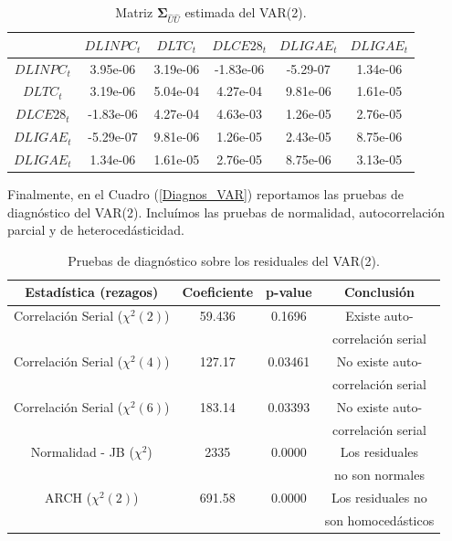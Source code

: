\documentclass[
  a4paper,
]{article}
\begin{document}
\begin{table}
\centering
\begin{tabular}{| c | c  c  c  c  c |}
\hline
     & $DLINPC_t$ & $DLTC_t$ & $DLCE28_t$ & $DLIGAE_t$ & $DLIGAE_t$ \\ \hline
    $DLINPC_t$ & 3.95e-06 & 3.19e-06 & -1.83e-06 & -5.29-07 & 1.34e-06 \\
    $DLTC_t$ & 3.19e-06 & 5.04e-04 & 4.27e-04 & 9.81e-06 & 1.61e-05 \\
    $DLCE28_t$ & -1.83e-06 & 4.27e-04 & 4.63e-03 & 1.26e-05 & 2.76e-05 \\
    $DLIGAE_t$ & -5.29e-07 & 9.81e-06 & 1.26e-05 & 2.43e-05 & 8.75e-06 \\
    $DLIGAE_t$ & 1.34e-06 & 1.61e-05 & 2.76e-05 & 8.75e-06 & 3.13e-05 \\
\hline
\end{tabular}
\caption{Matriz $\mathbf{\Sigma}_{\hat{U}\hat{U}}$ estimada del VAR(2).}

\end{table}

Finalmente, en el Cuadro (\ref{Diagnos_VAR}) reportamos las pruebas de
diagnóstico del VAR(2). Incluímos las pruebas de normalidad,
autocorrelación parcial y de heterocedásticidad.

\begin{table}
\centering
\begin{tabular}{| c | c | c | c |}
\hline
    Estadística (rezagos) & Coeficiente & p-value & Conclusión \\ 
\hline
    Correlación Serial ($\chi^2 (2)$) & 59.436 & 0.1696 & Existe auto- \\
     &  &  & correlación serial \\
    Correlación Serial ($\chi^2 (4)$) & 127.17 & 0.03461 & No existe auto- \\
     &  &  & correlación serial \\
    Correlación Serial ($\chi^2 (6)$) & 183.14 & 0.03393 & No existe auto- \\
     &  &  & correlación serial \\
    Normalidad - JB ($\chi^2$) & 2335 & 0.0000 & Los residuales \\
     &  &  & no son normales \\
    ARCH ($\chi^2 (2)$) & 691.58 & 0.0000 & Los residuales no \\
     &  &  & son homocedásticos \\
\hline
\end{tabular}
\caption{Pruebas de diagnóstico sobre los residuales del VAR(2).}

\end{table}
\end{document}
